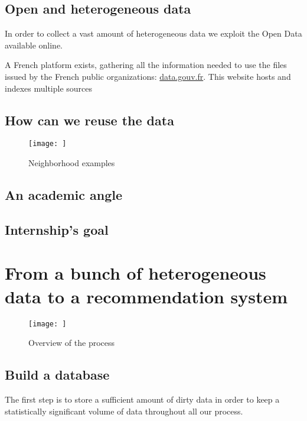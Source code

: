 \documentclass[a4paper]{article}
\begin{document}
	\subsection{Open and heterogeneous data}
	
	In order to collect a vast amount of heterogeneous data we exploit the Open Data available online.
	
	
	A French platform exists, gathering all the information needed to use the files issued by the French public organizations: \href{http://www.data.gouv.fr/fr/}{data.gouv.fr}. This website hosts and indexes multiple sources
	
	\subsection{How can we reuse the data}
	
	\begin{figure}
		\centering
		\texttt{[image: ]}
		\caption{Neighborhood examples}
		\label{fig:neighbor-police}
	\end{figure}
	
	\subsection{An academic angle}
	
	\subsection{Internship's goal}
	
	\section{From a bunch of heterogeneous data to a recommendation system}
	
	\begin{figure}
		\centering
		\texttt{[image: ]}
		\caption{Overview of the process}
		\label{fig:global-pipeline}
	\end{figure}
	
	\subsection{Build a database}
	
	The first step is to store a sufficient amount of dirty data in order to keep a statistically significant volume of data throughout all our process.
	
\end{document}
